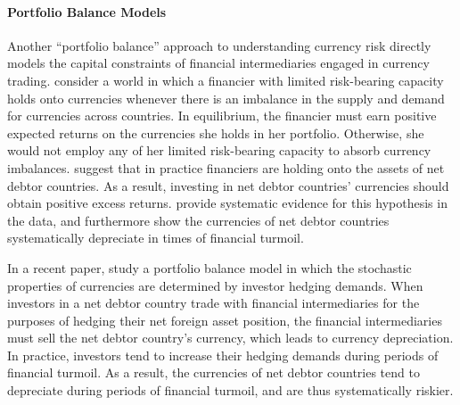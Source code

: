 \documentclass{ar-1col}
\begin{document}
\paragraph*{Portfolio Balance Models} Another ``portfolio balance'' approach to understanding currency risk directly models the capital constraints of financial intermediaries engaged in currency trading. \citet{GabaixMaggiori2015} consider a world in which a financier with limited risk-bearing capacity holds onto currencies whenever there is an imbalance in the supply and demand for currencies across countries. In equilibrium, the financier must earn positive expected returns on the currencies she holds in her portfolio. Otherwise, she would not employ any of her limited risk-bearing capacity to absorb currency imbalances. \citet{GabaixMaggiori2015} suggest that in practice financiers are holding onto the assets of net debtor countries. As a result, investing in net debtor countries' currencies should obtain positive excess returns. \citet{DellaCorteetal2009} provide systematic evidence for this hypothesis in the data, and furthermore show the currencies of net debtor countries systematically depreciate in times of financial turmoil.

In a recent paper, \citet{LiaoZhang2020} study a portfolio balance model in which the stochastic properties of currencies are determined by investor hedging demands. When investors in a net debtor country trade with financial intermediaries for the purposes of hedging their net foreign asset position, the financial intermediaries must sell the net debtor country's currency, which leads to currency depreciation. In practice, investors tend to increase their hedging demands during periods of financial turmoil. As a result, the currencies of net debtor countries tend to depreciate during periods of financial turmoil, and are thus systematically riskier.
 
\end{document}
